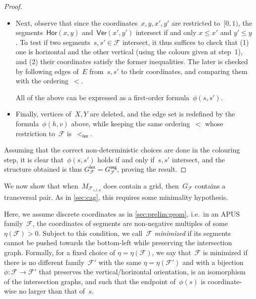 \documentclass[a4paper,UKenglish,cleveref,thm-restate]{lipics-v2021}
\theoremstyle{remark}
\newcommand{\Fc}{\mathcal{F}}
\newcommand{\lex}{\mathsf{lex}}
\newcommand{\seg}{\mathsf{seg}}
\newcommand{\Vseg}{\mathsf{Ver}}
\newcommand{\Hseg}{\mathsf{Hor}}
\begin{document}
\begin{proof}
\begin{itemize}
        \item Next, observe that since the coordinates~$x,y,x',y'$ are restricted to~$[0,1)$, the segments~$\Hseg(x,y)$ and~$\Vseg(x',y')$ intersect if and only $x \le x'$ and $y' \le y$.
        To test if two segments~$s,s' \in \Fc$ intersect,
        it thus suffices to check that (1) one is horizontal and the other vertical (using the colours given at step~1),
        and (2) their coordinates satisfy the former inequalities.
        The later is checked by following edges of~$E$ from~$s,s'$ to their coordinates, and comparing them with the ordering~$<$.
        
        All of the above can be expressed as a first-order formula~$\phi(s,s')$.
        
        \item Finally, vertices of~$X,Y$ are deleted, and the edge set is redefined by the formula~$\phi(h,v)$ above, while keeping the same ordering~$<$ whose restriction to~$\Fc$ is~$<_\lex$.
    \end{itemize}
    Assuming that the correct non-deterministic choices are done in the colouring step,
    it is clear that~$\phi(s,s')$ holds if and only if~$s,s'$ intersect,
    and the structure obtained is thus $G_\Fc^\lex = G_\Fc^\seg$, proving the result.
\end{proof}

We now show that when~$M_{\Fc_{s,t,d}}$ does contain a grid, then~$G_\Fc$ contains a transversal pair.
As in \cref{sec:cag}, this requires some minimality hypothesis.

Here, we assume discrete coordinates as in \cref{sec:prelim:geom},
i.e.\ in an APUS family~$\Fc$, the coordinates of segments are non-negative multiples of some $\eta(\Fc)>0$.
Subject to this condition, we call~$\Fc$ \emph{minimized} if its segments cannot be pushed towards the bottom-left while preserving the intersection graph.
Formally, for a fixed choice of $\eta = \eta(\Fc)$, we say that~$\Fc$ is minimized if there is no different family~$\Fc'$ with the same $\eta = \eta(\Fc')$ and with a bijection~$\phi : \Fc \to \Fc'$
that preserves the vertical/horizontal orientation, is an isomorphism of the intersection graphs,
and such that the endpoint of~$\phi(s)$ is coordinate-wise no larger than that of~$s$.
\end{document}
